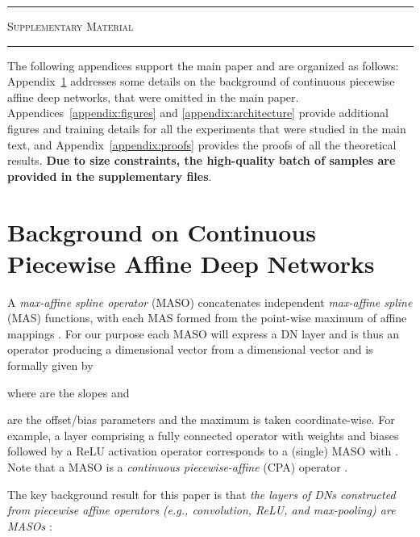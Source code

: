 \begin{center}
\hrule
\Huge{
    \textsc{Supplementary Material}}
    \vspace{0.3cm}
\hrule
\end{center}
\vspace{0.3cm}











The following appendices support the main paper and are organized as follows: 
Appendix~\ref{appendix:maso} addresses some details on the background of continuous piecewise affine deep networks, that were omitted in the main paper.
Appendices~\ref{appendix:figures} and \ref{appendix:architecture} provide additional figures and training details for all the experiments that were studied in the main text, and Appendix~\ref{appendix:proofs} provides the proofs of all the theoretical results. {\bf Due to size constraints, the high-quality batch of samples are provided in the supplementary files}.


\section{Background on Continuous Piecewise Affine Deep Networks}
\label{appendix:maso}
A {\em max-affine spline operator} (MASO) concatenates independent {\em max-affine spline} (MAS) functions, with each MAS formed from the point-wise maximum of  affine mappings
\citep{magnani2009convex,hannah2013multivariate}. For our purpose each MASO will express a DN layer and is thus an operator producing a  dimensional vector from a  dimensional vector and is formally given by

\vspace{-0.2em}
where  are the slopes and 
 
are the offset/bias parameters and the maximum is taken coordinate-wise. For example, a layer comprising a fully connected operator with weights  and biases  followed by a ReLU activation operator corresponds to a (single) MASO with .
Note that a MASO is a {\em continuous piecewise-affine} (CPA) operator \citep{wang2005generalization}.

The key background result for this paper is that {\em the layers of DNs constructed from piecewise affine operators (e.g., convolution, ReLU, and max-pooling) are MASOs}
\citep{balestriero2018spline,reportRB}:

